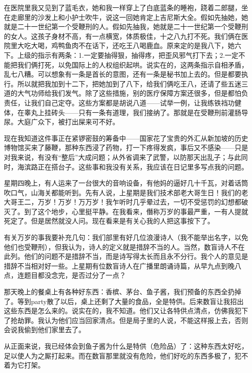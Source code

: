 在医院里我又见到了蓝毛衣，她和我一样穿上了白底蓝条的睡袍，跷着二郎腿，坐在走廊里的沙发上和小护士吹牛，说这一回她肯定上吉尼斯大全。假如先抽她，她就是二十一世纪第一个受鞭刑的人。假如先抽我，她就是二十一世纪第一个受鞭刑的女人。这孩子身材不高，有一点横宽，体质极佳，十之八九打不死。我们俩在医院里大吃大喝，鸡鸭鱼肉不在话下，还吃王八喝鹿血。原来定的是我八下，她六下。上级的指示有两条：1.一定要抽得狠，抽得疼，把歪风邪气打下去；2.一定不能把我们俩打死，以免国际上的人权组织起哄。说实在的，这两条指示自相矛盾，乱七八糟。可以想象有一条是首长的意图，还有一条是秘书加上去的。但是都要执行。所以就把我加到十二下，把她加到了八下，给我们俩吃王八，还请了些五迷三道的大气功师给我们发气。除了这些措施，别的医疗保障方案还很多，但是都怕负责任，让我们自己定夺。这些方案都是胡说八道——试举一例，让我练铁裆功健体，在睾丸上挂砖头——只有一条有道理，我们接纳了。那就是在受鞭刑前灌肠导尿。大庭广众下，被打出屎来可不好。 

现在我知道这件事正在紧锣密鼓的筹备中——国家花了宝贵的外汇从新加坡的历史博物馆买来了藤鞭，那种东西浸了药物，打一下疼得发疯，事后又不感染——只是对我来说，有没有“整后”大成问题；从外省调来了武警，以防那天出乱子；与此同时，海滨路正在搭台子。这些事和我没有关系，我应该在日记里多写点我的问题。 



星期四晚上，有人运来了一台很大的音响设备，有他妈的逼好几十千瓦，对着话筒吹口气，山海关都能听到。先有人说，上星期是我们技术部老大哥生日！我们的老大哥王二，万岁！万岁！万万岁！我乍听时几乎晕过去，一切不受惩罚的幻想都破灭了。到了这个地步，心里挺平静。在我看来，僭称万岁的事最严重，一有人提就死定了。但是居然就没人问。现在看来是有关心我的人把这事按下了。 

有关万岁的事我要补充几句：我们部里有好几位浪漫诗人（我不能举出名字，以免他们也受鞭刑），但我认为，诗人的定义就是措辞不当的人。当然，数盲诗人不在此列。他们的问题不是措辞不当，而是诗写得太长而且永不分行。我个人的意见是措辞不当相对好一些。上星期有位数盲诗人在广播里朗诵诗篇，从早九点到晚八点，连题目都没念完，是否过分了一点？ 

那天晚上的餐桌上有各种好东西：香槟、茅台、鱼子酱，我们预备的东西全扔掉了。等到party散了以后，桌上还剩了大量的食品，全是特供。后来数盲让我招出这些东西是怎么来的。说实在的，我不知道。他们又让各特供点清点，仿佛我犯下了抢劫罪。我认为他们应当回家清点。但是局子里的人说，不能这样报上去，否则会说我偷到他们家里去了。 

从正面来说，我已经体会到鱼子酱为什么是特供（危险品）了：这种东西太好吃，足以使人为之厮打起来。而在数盲那里就没有危险，他们好吃的东西多极了，犯不着为它打架。 



